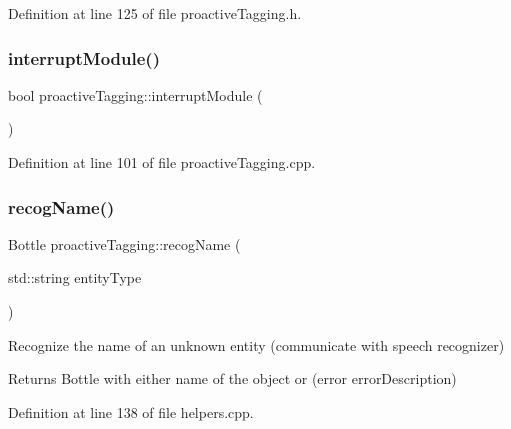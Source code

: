Definition at line 125 of file proactive\+Tagging.\+h.

\mbox{\label{classproactiveTagging_aaf4c0db3e658e44211ea8ccd3e0e91dc}} 
\subsubsection{\texorpdfstring{interrupt\+Module()}{interruptModule()}}
{\footnotesize\ttfamily bool proactive\+Tagging\+::interrupt\+Module (\begin{DoxyParamCaption}{ }\end{DoxyParamCaption})}



Definition at line 101 of file proactive\+Tagging.\+cpp.

\mbox{\label{classproactiveTagging_aaf4838d9ca0569c9cfbe14f406c9fa04}} 
\subsubsection{\texorpdfstring{recog\+Name()}{recogName()}}
{\footnotesize\ttfamily Bottle proactive\+Tagging\+::recog\+Name (\begin{DoxyParamCaption}\item[{std\+::string}]{entity\+Type }\end{DoxyParamCaption})\hspace{0.3cm}{\ttfamily [protected]}}



Recognize the name of an unknown entity (communicate with speech recognizer) 

\begin{DoxyReturn}{Returns}
Bottle with either name of the object or (error error\+Description) 
\end{DoxyReturn}


Definition at line 138 of file helpers.\+cpp.

\mbox{\label{classproactiveTagging_a6d7c50fb7e1b26cd1c7d757ef3640359}} 
